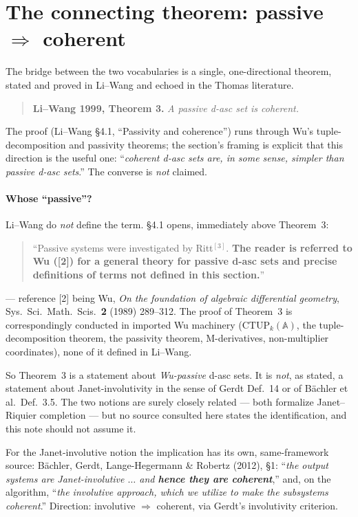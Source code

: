\documentclass[11pt]{article}
\begin{document}
\section{The connecting theorem: passive $\Rightarrow$ coherent}

The bridge between the two vocabularies is a single, one-directional theorem,
stated and proved in Li--Wang and echoed in the Thomas literature.

\begin{quote}
\textbf{Li--Wang 1999, Theorem 3.} \emph{A passive d-asc set is coherent.}
\end{quote}

\noindent
The proof (Li--Wang \S4.1, ``Passivity and coherence'') runs through Wu's
tuple-decomposition and passivity theorems; the section's framing is explicit
that this direction is the useful one: ``\emph{coherent d-asc sets are, in some
sense, simpler than passive d-asc sets}.'' The converse is \emph{not} claimed.

\paragraph{Whose ``passive''?} Li--Wang do \emph{not} define the term. \S4.1
opens, immediately above Theorem~3:

\begin{quote}
``Passive systems were investigated by Ritt$^{[3]}$. \textbf{The reader is
referred to Wu ([2]) for a general theory for passive d-asc sets and precise
definitions of terms not defined in this section.}''
\end{quote}

\noindent
--- reference [2] being Wu, \emph{On the foundation of algebraic differential
geometry}, Sys.\ Sci.\ Math.\ Scis.\ \textbf{2} (1989) 289--312. The proof of
Theorem~3 is correspondingly conducted in imported Wu machinery
($\mathrm{CTUP}_k(\mathbb{A})$, the tuple-decomposition theorem, the passivity
theorem, M-derivatives, non-multiplier coordinates), none of it defined in
Li--Wang.

So Theorem~3 is a statement about \emph{Wu-passive} d-asc sets. It is
\emph{not}, as stated, a statement about Janet-involutivity in the sense of
Gerdt Def.~14 or of B\"achler et al.\ Def.~3.5. The two notions are surely
closely related --- both formalize Janet--Riquier completion --- but no source
consulted here states the identification, and this note should not assume it.

\noindent
For the Janet-involutive notion the implication has its own, same-framework
source: B\"achler, Gerdt, Lange-Hegermann \& Robertz (2012), \S1: ``\emph{the
output systems are Janet-involutive $\dots$ and \textbf{hence they are
coherent}},'' and, on the algorithm, ``\emph{the involutive approach, which we
utilize to make the subsystems coherent}.'' Direction: involutive
$\Rightarrow$ coherent, via Gerdt's involutivity criterion.
\end{document}
